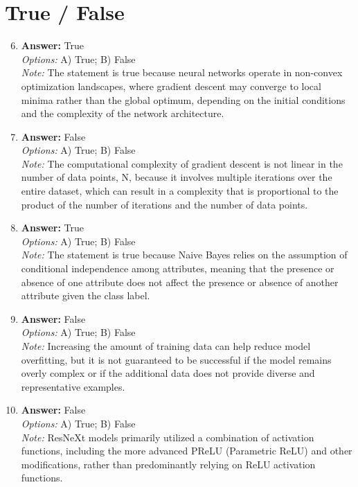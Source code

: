 \documentclass[12pt]{article}
\begin{document}
\section*{True / False}
\begin{enumerate}[label=\arabic*.]
\setcounter{enumi}{5}
\item \textbf{Answer:} True
\\ \textit{Options:} A) True; B) False
\\ \textit{Note:} The statement is true because neural networks operate in non-convex optimization landscapes, where gradient descent may converge to local minima rather than the global optimum, depending on the initial conditions and the complexity of the network architecture.
\item \textbf{Answer:} False
\\ \textit{Options:} A) True; B) False
\\ \textit{Note:} The computational complexity of gradient descent is not linear in the number of data points, N, because it involves multiple iterations over the entire dataset, which can result in a complexity that is proportional to the product of the number of iterations and the number of data points.
\item \textbf{Answer:} True
\\ \textit{Options:} A) True; B) False
\\ \textit{Note:} The statement is true because Naive Bayes relies on the assumption of conditional independence among attributes, meaning that the presence or absence of one attribute does not affect the presence or absence of another attribute given the class label.
\item \textbf{Answer:} False
\\ \textit{Options:} A) True; B) False
\\ \textit{Note:} Increasing the amount of training data can help reduce model overfitting, but it is not guaranteed to be successful if the model remains overly complex or if the additional data does not provide diverse and representative examples.
\item \textbf{Answer:} False
\\ \textit{Options:} A) True; B) False
\\ \textit{Note:} ResNeXt models primarily utilized a combination of activation functions, including the more advanced PReLU (Parametric ReLU) and other modifications, rather than predominantly relying on ReLU activation functions.
\end{enumerate}
\end{document}
